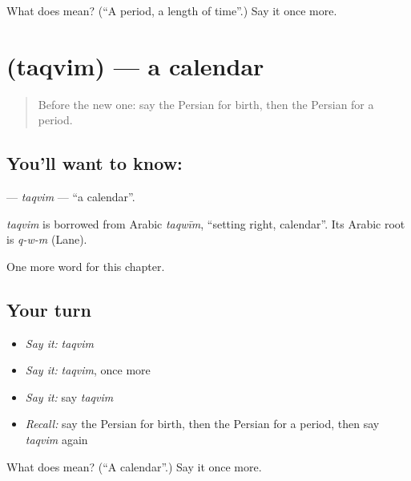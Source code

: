 \begin{tcolorbox}[breakable,colback=teal!4,colframe=teal!35!black,title={Before you move on}]
What does  mean? (\textquotedblleft{}A period, a length of time\textquotedblright{}.) Say it once more.
\end{tcolorbox}
\section[\texorpdfstring{\fa{تقویم} (taqvim)}{تقویم (taqvim)}]{ (taqvim) — a calendar}

\label{lesson:FA-C229-taqvim}



\begin{quote}
Before the new one: say the Persian for birth, then the Persian for a period.
\end{quote}

\subsection*{You'll want to know: }
\textbf{} — \emph{taqvim} — \textquotedblleft{}a calendar\textquotedblright{}.

\begin{cousinweb}
\emph{taqvim} is borrowed from Arabic \emph{taqwīm}, \textquotedblleft{}setting right, calendar\textquotedblright{}. Its Arabic root is \emph{q-w-m} (Lane).
\end{cousinweb}

\begin{grammarlens}[title={What you've built}]
One more word for this chapter.
\end{grammarlens}

\subsection*{Your turn}
\begin{itemize}
\raggedright
  \item \emph{Say it:} \emph{taqvim}
  \item \emph{Say it:} \emph{taqvim}, once more
  \item \emph{Say it:} say \emph{taqvim}
  \item \emph{Recall:} say the Persian for birth, then the Persian for a period, then say \emph{taqvim} again
\end{itemize}

\begin{tcolorbox}[breakable,colback=teal!4,colframe=teal!35!black,title={Before you move on}]
What does  mean? (\textquotedblleft{}A calendar\textquotedblright{}.) Say it once more.
\end{tcolorbox}
